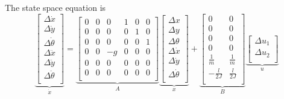 The state space equation is
\begin{equation}
    \underset{\dot{x}}{\underbrace{\left[ \begin{array}{c}
        \Delta \dot{x}\\
        \Delta \dot{y}\\
        \Delta \dot{\theta}\\
        \Delta \ddot{x}\\
        \Delta \ddot{y}\\
        \Delta \ddot{\theta}\\
    \end{array} \right] }}=\underset{A}{\underbrace{\left[ \begin{matrix}
        0&		0&		0&		1&		0&		0\\
        0&		0&		0&		0&		1&		0\\
        0&		0&		0&		0&		0&		1\\
        0&		0&		-g&		0&		0&		0\\
        0&		0&		0&		0&		0&		0\\
        0&		0&		0&		0&		0&		0\\
    \end{matrix} \right] }}\underset{x}{\underbrace{\left[ \begin{array}{c}
        \Delta x\\
        \Delta y\\
        \Delta \theta\\
        \Delta \dot{x}\\
        \Delta \dot{y}\\
        \Delta \dot{\theta}\\
    \end{array} \right] }}+\underset{B}{\underbrace{\left[ \begin{matrix}
        0&		0\\
        0&		0\\
        0&		0\\
        0&		0\\
        \frac{1}{m}&		\frac{1}{m}\\
        -\frac{l}{2J}&		\frac{l}{2J}\\
    \end{matrix} \right] }}\underset{u}{\underbrace{\left[ \begin{array}{c}
        \Delta u_1\\
        \Delta u_2\\
    \end{array} \right] }}
\end{equation}

